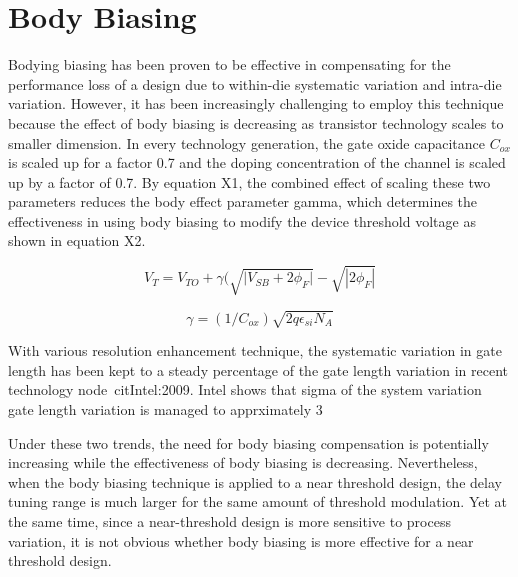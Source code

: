 \section{Body Biasing}
\label{sec:bodybiasing}

Bodying biasing has been proven to be effective in compensating for the
performance loss of a design due to within-die systematic variation and
intra-die variation. However, it has been increasingly challenging to employ
this technique because the effect of body biasing is decreasing as transistor
technology scales to smaller dimension. In every technology generation, the gate
oxide capacitance $C_{ox}$ is scaled up for a factor 0.7 and the doping
concentration of the channel is scaled up by a factor of 0.7. By equation X1,
the combined effect of scaling these two parameters reduces the body effect
parameter gamma, which determines the effectiveness in using body biasing to
modify the device threshold voltage as shown in equation X2.

\begin{equation}
V_{T} = V_{TO} + \gamma ( \sqrt{ | {V_{SB} + 2\phi_{F} | } } - \sqrt{ | 2\phi_{F} | } 
\end{equation}

\begin{equation}
\gamma = (1/C_{ox})\sqrt{2q\epsilon_{si}N_A}
\end{equation}

With various resolution enhancement technique, the systematic variation in gate length has been kept to a steady percentage of the gate length variation in recent technology node~cit{Intel:2009}. Intel shows that sigma of the system variation gate length variation is managed to apprximately 3%


Under these two trends, the need for body biasing compensation is potentially increasing
while the effectiveness of body biasing is decreasing. Nevertheless, when the
body biasing technique is applied to a near threshold design, the delay tuning
range is much larger for the same amount of threshold modulation. Yet at the
same time, since a near-threshold design is more sensitive to process variation,
it is not obvious whether body biasing is more effective for a near threshold
design. 

